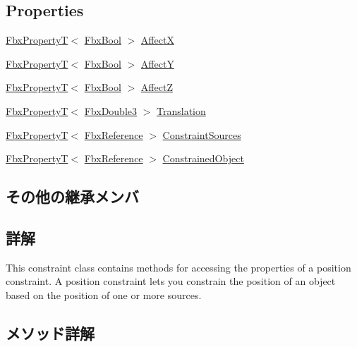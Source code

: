 \subsection*{Properties}
\begin{DoxyCompactItemize}
\item 
\hyperlink{class_fbx_property_t}{Fbx\+PropertyT}$<$ \hyperlink{fbxtypes_8h_a92e0562b2fe33e76a242f498b362262e}{Fbx\+Bool} $>$ \hyperlink{class_fbx_constraint_position_a2488e70c6bd35dd13cafa4234a21ca5c}{AffectX}
\item 
\hyperlink{class_fbx_property_t}{Fbx\+PropertyT}$<$ \hyperlink{fbxtypes_8h_a92e0562b2fe33e76a242f498b362262e}{Fbx\+Bool} $>$ \hyperlink{class_fbx_constraint_position_afa5910286c656a2e87398645e3e3114d}{AffectY}
\item 
\hyperlink{class_fbx_property_t}{Fbx\+PropertyT}$<$ \hyperlink{fbxtypes_8h_a92e0562b2fe33e76a242f498b362262e}{Fbx\+Bool} $>$ \hyperlink{class_fbx_constraint_position_a4d99852028aff66edc99d669d2f1bbae}{AffectZ}
\item 
\hyperlink{class_fbx_property_t}{Fbx\+PropertyT}$<$ \hyperlink{fbxtypes_8h_ae0a96f14cde566774c7553aa7523b7a7}{Fbx\+Double3} $>$ \hyperlink{class_fbx_constraint_position_a90906bf60f276cd04cb1afebce8b9816}{Translation}
\item 
\hyperlink{class_fbx_property_t}{Fbx\+PropertyT}$<$ \hyperlink{fbxtypes_8h_a44df6a2eec915cf27cd481e5c5e48a24}{Fbx\+Reference} $>$ \hyperlink{class_fbx_constraint_position_a52d5190a6c10807e4f52383d05ceae38}{Constraint\+Sources}
\item 
\hyperlink{class_fbx_property_t}{Fbx\+PropertyT}$<$ \hyperlink{fbxtypes_8h_a44df6a2eec915cf27cd481e5c5e48a24}{Fbx\+Reference} $>$ \hyperlink{class_fbx_constraint_position_a5b6779be7ae7e754c31aac3552990df3}{Constrained\+Object}
\end{DoxyCompactItemize}
\subsection*{その他の継承メンバ}


\subsection{詳解}
This constraint class contains methods for accessing the properties of a position constraint. A position constraint lets you constrain the position of an object based on the position of one or more sources. 

\subsection{メソッド詳解}
\mbox{\label{class_fbx_constraint_position_a887955c9fefa271dcabb46e2c61ca9e1}} 
